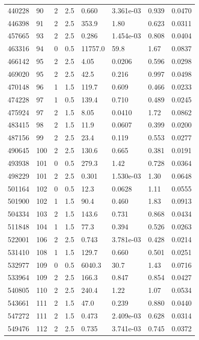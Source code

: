 \documentclass[preview]{standalone}
\begin{document}
{{{{\begin{tabular}{L{1.2cm}C{1.2cm} C{0.3cm}C{0.5cm} C{1.4cm}C{1.4cm} C{1.4cm}C{1.4cm}}
  440228  &    90  & 2     & 2.5 &  0.660  & 3.361e-03  & 0.939 &  0.0470   \\ 
  446398  &    91  & 2     & 2.5 &  353.9  & 1.80  & 0.623 &  0.0311   \\ 
  457665  &    93  & 2     & 2.5 &  0.286  & 1.454e-03  & 0.808 &  0.0404   \\ 
  463316  &    94  & 0     & 0.5 &  11757.0  & 59.8  & 1.67 &  0.0837   \\ 
  466142  &    95  & 2     & 2.5 &  4.05  & 0.0206  & 0.596 &  0.0298   \\ 
  469020  &    95  & 2     & 2.5 &  42.5  & 0.216  & 0.997 &  0.0498   \\ 
  470148  &    96  & 1     & 1.5 &  119.7  & 0.609  & 0.466 &  0.0233   \\ 
  474228  &    97  & 1     & 0.5 &  139.4  & 0.710  & 0.489 &  0.0245   \\ 
  475924  &    97  & 2     & 1.5 &  8.05  & 0.0410  & 1.72 &  0.0862   \\ 
  483415  &    98  & 2     & 1.5 &  11.9  & 0.0607  & 0.399 &  0.0200   \\ 
  487156  &    99  & 2     & 2.5 &  23.4  & 0.119  & 0.553 &  0.0277   \\ 
  490645  &   100  & 2     & 2.5 &  130.6  & 0.665  & 0.381 &  0.0191   \\ 
  493938  &   101  & 0     & 0.5 &  279.3  & 1.42  & 0.728 &  0.0364   \\ 
  498229  &   101  & 2     & 2.5 &  0.301  & 1.530e-03  & 1.30 &  0.0648   \\ 
  501164  &   102  & 0     & 0.5 &  12.3  & 0.0628  & 1.11 &  0.0555   \\ 
  501900  &   102  & 1     & 1.5 &  90.4  & 0.460  & 1.83 &  0.0913   \\ 
  504334  &   103  & 2     & 1.5 &  143.6  & 0.731  & 0.868 &  0.0434   \\ 
  511848  &   104  & 1     & 1.5 &  77.3  & 0.394  & 0.526 &  0.0263   \\ 
  522001  &   106  & 2     & 2.5 &  0.743  & 3.781e-03  & 0.428 &  0.0214   \\ 
  531410  &   108  & 1     & 1.5 &  129.7  & 0.660  & 0.501 &  0.0251   \\ 
  532977  &   109  & 0     & 0.5 &  6040.3  & 30.7  & 1.43 &  0.0716   \\ 
  533964  &   109  & 2     & 2.5 &  166.3  & 0.847  & 0.854 &  0.0427   \\ 
  540805  &   110  & 2     & 2.5 &  240.4  & 1.22  & 1.07 &  0.0534   \\ 
  543661  &   111  & 2     & 1.5 &  47.0  & 0.239  & 0.880 &  0.0440   \\ 
  547272  &   111  & 2     & 1.5 &  0.473  & 2.409e-03  & 0.628 &  0.0314   \\ 
  549476  &   112  & 2     & 2.5 &  0.735  & 3.741e-03  & 0.745 &  0.0372   \\ 
\hline 
\end{tabular} 

}}}}
\end{document}
